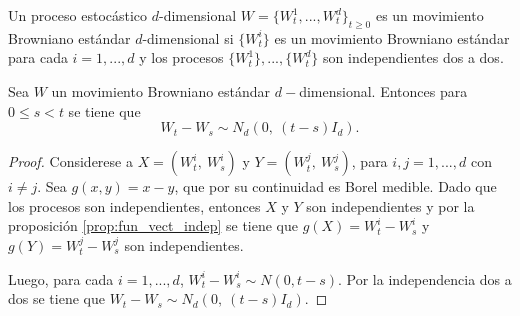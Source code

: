 \begin{definition}
    Un proceso estocástico $d$-dimensional $W = \{W_t^1,...,
    W_t^d\}_{t\geq 0}$ es un movimiento Browniano estándar
    $d$-dimensional si $\{W_t^i\}$ es un movimiento Browniano 
    estándar para cada $i=1,...,d$ y los procesos $\{W_t^1\},...,\{W_t^d\}$
    son independientes dos a dos.
\end{definition}

\begin{proposition}\label{prop:dist_saltos_MB}
    Sea $W$ un movimiento Browniano estándar $d-$dimensional. Entonces 
    para $0\leq s < t$ se tiene que 
    $$W_t-W_s \sim N_d(0,\ (t-s)I_d).$$
\end{proposition}

\begin{proof}
Considerese a $X=(W_t^i,\ W_s^i)$ y $Y=(W_t^j,\ W_s^j)$, para
$i,j=1,...,d$ con $i\not = j$. Sea $g(x,y)=x-y$, que por su 
continuidad es Borel medible. Dado que los procesos son independientes, 
entonces $X$ y $Y$ son independientes y por la proposición \ref{prop:fun_vect_indep}
se tiene que $g(X)=W_t^i-W_s^i$ y $g(Y)=W_t^j-W_s^j$ son independientes.

Luego, para cada $i=1,...,d$, $W_t^i-W_s^i\sim N(0, t-s)$. Por la 
independencia dos a dos se tiene que $W_t-W_s \sim N_d(0,\ (t-s)I_d)$.
\end{proof}

